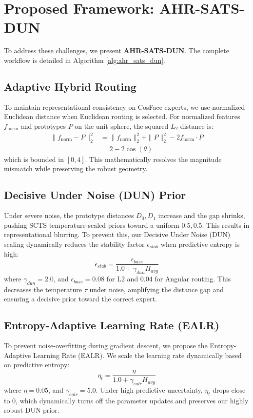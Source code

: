 \documentclass{article}
\theoremstyle{plain}
\theoremstyle{definition}
\theoremstyle{remark}
\begin{document}
\section{Proposed Framework: AHR-SATS-DUN}
To address these challenges, we present \textbf{AHR-SATS-DUN}. The complete workflow is detailed in Algorithm \ref{alg:ahr_sats_dun}.

\subsection{Adaptive Hybrid Routing}
To maintain representational consistency on CosFace experts, we use normalized Euclidean distance when Euclidean routing is selected. For normalized features $f_{\text{norm}}$ and prototypes $P$ on the unit sphere, the squared $L_2$ distance is:
\begin{align}
    \|f_{\text{norm}} - P\|_2^2 &= \|f_{\text{norm}}\|_2^2 + \|P\|_2^2 - 2 f_{\text{norm}} \cdot P \nonumber \\
    &= 2 - 2 \cos(\theta)
\end{align}
which is bounded in $[0, 4]$. This mathematically resolves the magnitude mismatch while preserving the robust geometry.

\subsection{Decisive Under Noise (DUN) Prior}
Under severe noise, the prototype distances $D_0, D_1$ increase and the gap shrinks, pushing SCTS temperature-scaled priors toward a uniform $0.5, 0.5$. This results in representational blurring. 
To prevent this, our Decisive Under Noise (DUN) scaling dynamically reduces the stability factor $\epsilon_{stab}$ when predictive entropy is high:
\begin{equation}
    \epsilon_{stab} = \frac{\epsilon_{base}}{1.0 + \gamma_{dun} H_{avg}}
\end{equation}
where $\gamma_{dun} = 2.0$, and $\epsilon_{base} = 0.08$ for L2 and $0.04$ for Angular routing. This decreases the temperature $\tau$ under noise, amplifying the distance gap and ensuring a decisive prior toward the correct expert.

\subsection{Entropy-Adaptive Learning Rate (EALR)}
To prevent noise-overfitting during gradient descent, we propose the Entropy-Adaptive Learning Rate (EALR). We scale the learning rate dynamically based on predictive entropy:
\begin{equation}
    \eta_t = \frac{\eta}{1.0 + \gamma_{ealr} H_{avg}}
\end{equation}
where $\eta = 0.05$, and $\gamma_{ealr} = 5.0$. Under high predictive uncertainty, $\eta_t$ drops close to $0$, which dynamically turns off the parameter updates and preserves our highly robust DUN prior.
\end{document}
